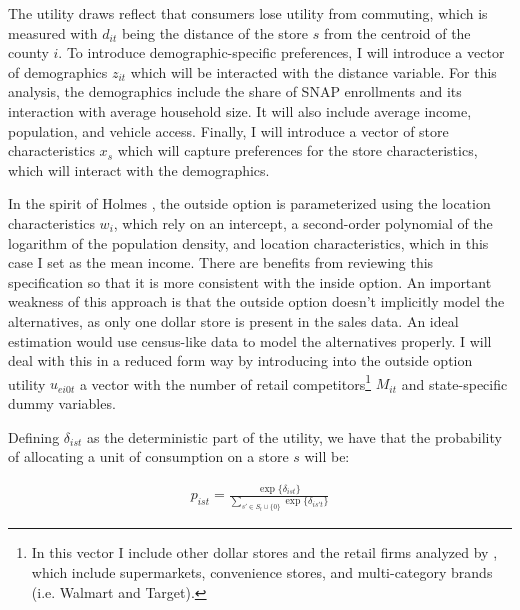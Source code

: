 \documentclass[11.5pt]{article}
\begin{document}
The utility draws reflect that consumers lose utility from commuting, which is measured with $d_{it}$ being the distance of the store $s$ from the centroid of the county $i$. To introduce demographic-specific preferences, I will introduce a vector of demographics $z_{it}$ which will be interacted with the distance variable. For this analysis, the demographics include the share of SNAP enrollments and its interaction with average household size. It will also include average income, population, and vehicle access. Finally, I will introduce a vector of store characteristics $x_s$ which will capture preferences for the store characteristics, which will interact with the demographics.


 In the spirit of Holmes \citeyear{holmes2011diffusion}, the outside option is parameterized using the location characteristics $w_i$, which rely on an intercept, a second-order polynomial of the logarithm of the population density, and location characteristics, which in this case I set as the mean income. There are benefits from reviewing this specification so that it is more consistent with the inside option. An important weakness of this approach is that the outside option doesn't implicitly model the alternatives, as only one dollar store is present in the sales data. An ideal estimation would use census-like data to model the alternatives properly. I will deal with this in a reduced form way by introducing into the outside option utility $u_{ei0t}$ a vector with the number of retail competitors\footnote{In this vector I include other dollar stores and the retail firms analyzed by \citeauthor{ellickson2020measuring} \citeyear{ellickson2020measuring}, which include supermarkets, convenience stores, and multi-category brands (i.e. Walmart and Target).} $M_{it}$ and state-specific dummy variables. 



Defining $\delta_{ist}$ as the deterministic part of the utility, we  have that the probability of allocating a unit of consumption on a store $s$ will be:

\begin{align}
    p_{ist} = \frac{\exp\{\delta_{ist}\}}{\sum_{s' \in S_t \cup \{0\}}\exp\{\delta_{is't}\} }
\end{align}
\end{document}
